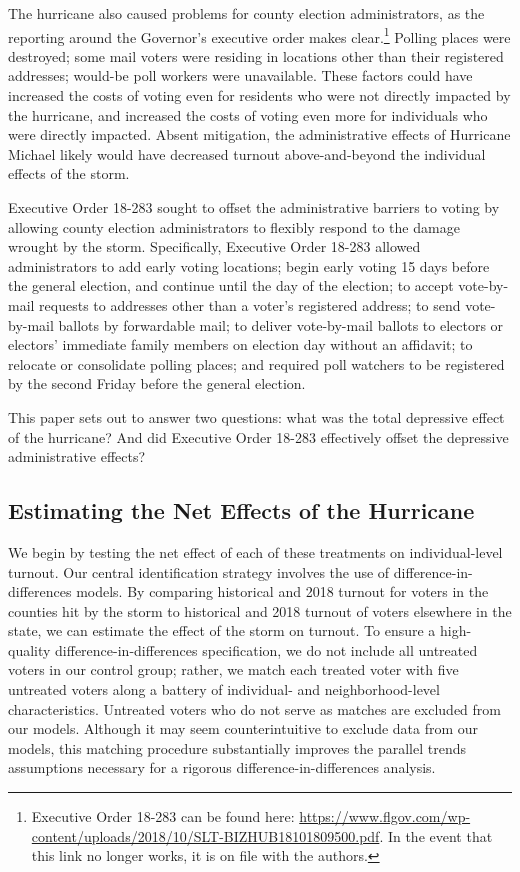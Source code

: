 \documentclass[
  12pt,
]{article}
\begin{document}
The hurricane also caused problems for county election administrators, as the reporting around the Governor's executive order makes clear.\footnote{Executive Order 18-283 can be found here: \url{https://www.flgov.com/wp-content/uploads/2018/10/SLT-BIZHUB18101809500.pdf}. In the event that this link no longer works, it is on file with the authors.} Polling places were destroyed; some mail voters were residing in locations other than their registered addresses; would-be poll workers were unavailable. These factors could have increased the costs of voting even for residents who were not directly impacted by the hurricane, and increased the costs of voting even more for individuals who were directly impacted. Absent mitigation, the administrative effects of Hurricane Michael likely would have decreased turnout above-and-beyond the individual effects of the storm.

Executive Order 18-283 sought to offset the administrative barriers to voting by allowing county election administrators to flexibly respond to the damage wrought by the storm. Specifically, Executive Order 18-283 allowed administrators to add early voting locations; begin early voting 15 days before the general election, and continue until the day of the election; to accept vote-by-mail requests to addresses other than a voter's registered address; to send vote-by-mail ballots by forwardable mail; to deliver vote-by-mail ballots to electors or electors' immediate family members on election day without an affidavit; to relocate or consolidate polling places; and required poll watchers to be registered by the second Friday before the general election.

This paper sets out to answer two questions: what was the total depressive effect of the hurricane? And did Executive Order 18-283 effectively offset the depressive administrative effects?

\hypertarget{estimating-the-net-effects-of-the-hurricane}{%
\subsection*{Estimating the Net Effects of the Hurricane}\label{estimating-the-net-effects-of-the-hurricane}}

We begin by testing the net effect of each of these treatments on individual-level turnout. Our central identification strategy involves the use of difference-in-differences models. By comparing historical and 2018 turnout for voters in the counties hit by the storm to historical and 2018 turnout of voters elsewhere in the state, we can estimate the effect of the storm on turnout. To ensure a high-quality difference-in-differences specification, we do not include all untreated voters in our control group; rather, we match each treated voter with five untreated voters along a battery of individual- and neighborhood-level characteristics. Untreated voters who do not serve as matches are excluded from our models. Although it may seem counterintuitive to exclude data from our models, this matching procedure substantially improves the parallel trends assumptions necessary for a rigorous difference-in-differences analysis.
\end{document}
